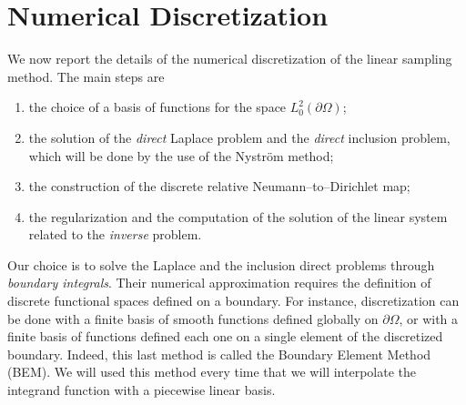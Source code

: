\documentclass[10pt, a4paper, twoside, openright]{book}
\theoremstyle{definition}
\theoremstyle{plain}
\theoremstyle{plain}
\theoremstyle{plain}
\theoremstyle{plain}
\theoremstyle{plain}
\theoremstyle{plain}
\theoremstyle{plain}
\theoremstyle{plain}
\begin{document}
\section{Numerical Discretization}
We now report the details of the numerical discretization of the linear sampling method. The main 
steps are
\begin{enumerate}
 \item the choice of a basis of functions for the space $L^2_0(\partial \Omega)$;
 \item the solution of the \emph{direct} Laplace problem and the \emph{direct} inclusion problem, 
 which will be done by the use of the Nystr\"om method;
 \item the construction of the discrete relative Neumann--to--Dirichlet map;
 \item the regularization and the computation of the solution of the linear system related 
 to the \emph{inverse} problem.
\end{enumerate}
Our choice is to solve the Laplace and the inclusion direct problems  
through \emph{boundary integrals}. Their numerical approximation requires the definition of discrete 
functional spaces defined on a boundary. 
For instance, discretization can be done with a finite basis of smooth functions defined globally 
on $\partial \Omega$, or with a finite basis of functions defined each one on a single element of 
the discretized boundary. Indeed, this last method is called the Boundary Element Method (BEM). 
We will used this method every time that we will interpolate the integrand function with a piecewise 
linear basis.
\end{document}
